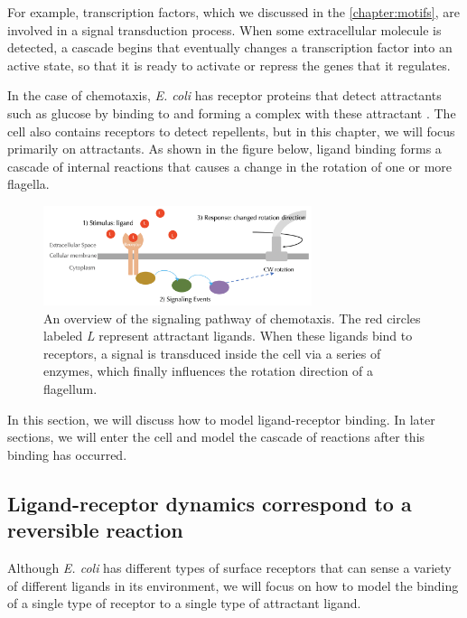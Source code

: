 For example, transcription factors, which we discussed in the \autoref{chapter:motifs}, are involved in a signal transduction process. When some extracellular molecule is detected, a cascade begins that eventually changes a transcription factor into an active state, so that it is ready to activate or repress the genes that it regulates.

In the case of chemotaxis, \textit{E. coli} has receptor proteins that detect attractants such as glucose by binding to and forming a complex with these attractant . The cell also contains receptors to detect repellents, but in this chapter, we will focus primarily on attractants. As shown in the figure below, ligand binding forms a cascade of internal reactions that causes a change in the rotation of one or more flagella.

\begin{figure}[h]
\centering
\mySfFamily
\includegraphics[width = 0.7\textwidth]{../images/chemotaxis_signal.png}
\caption{An overview of the signaling pathway of chemotaxis. The red circles labeled \textit{L} represent attractant ligands. When these ligands bind to receptors, a signal is transduced inside the cell via a series of enzymes, which finally influences the rotation direction of a flagellum.}
\label{fig:chemotaxis_signal}
\end{figure}

In this section, we will discuss how to model ligand-receptor binding. In later sections, we will enter the cell and model the cascade of reactions after this binding has occurred.

\FloatBarrier
{}
\subsection{Ligand-receptor dynamics correspond to a reversible reaction}

Although \textit{E. coli} has different types of surface receptors that can sense a variety of different ligands in its environment, we will focus on how to model the binding of a single type of receptor to a single type of attractant ligand.

